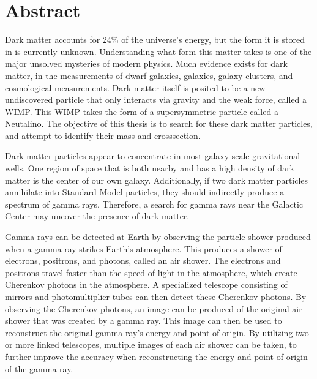\cleartooddpage[\thispagestyle{empty}]
\section*{Abstract}

Dark matter accounts for 24\% of the universe's energy, but the form it is stored in is currently unknown.
Understanding what form this matter takes is one of the major unsolved mysteries of modern physics.
Much evidence exists for dark matter, in the measurements of dwarf galaxies, galaxies, galaxy clusters, and cosmological measurements.
Dark matter itself is posited to be a new undiscovered particle that only interacts via gravity and the weak force, called a WIMP.
This WIMP takes the form of a supersymmetric particle called a Neutalino.
The objective of this thesis is to search for these dark matter particles, and attempt to identify their mass and crosssection.

Dark matter particles appear to concentrate in most galaxy-scale gravitational wells.
One region of space that is both nearby and has a high density of dark matter is the center of our own galaxy.
Additionally, if two dark matter particles annihilate into Standard Model particles, they should indirectly produce a spectrum of gamma rays.
Therefore, a search for gamma rays near the Galactic Center may uncover the presence of dark matter.

Gamma rays can be detected at Earth by observing the particle shower produced when a gamma ray strikes Earth's atmosphere.
This produces a shower of electrons, positrons, and photons, called an air shower.
The electrons and positrons travel faster than the speed of light in the atmosphere, which create Cherenkov photons in the atmosphere.
A specialized telescope consisting of mirrors and photomultiplier tubes can then detect these Cherenkov photons.
By observing the Cherenkov photons, an image can be produced of the original air shower that was created by a gamma ray.
This image can then be used to reconstruct the original gamma-ray's energy and point-of-origin.
By utilizing two or more linked telescopes, multiple images of each air shower can be taken, to further improve the accuracy when reconstructing the energy and point-of-origin of the gamma ray.

